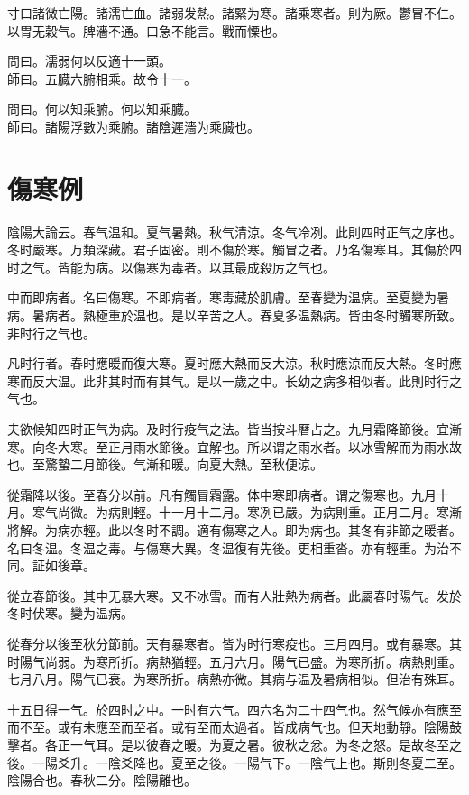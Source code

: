 \documentclass[b5paper,twoside,zihao=-4,UTF8]{ctexbook}
\begin{document}
寸口諸微亡陽。諸濡亡血。諸弱发熱。諸緊为寒。諸乘寒者。則为厥。鬱冒不仁。以胃无穀气。脾濇不通。口急不能言。戰而慄也。

問曰。濡弱何以反適十一頭。\\
師曰。五臓六腑相乘。故令十一。

問曰。何以知乘腑。何以知乘臓。\\
師曰。諸陽浮數为乘腑。諸陰遲濇为乘臓也。

\chapter{傷寒例}

陰陽大論云。春气温和。夏气暑熱。秋气清涼。冬气冷冽。此則四时正气之序也。冬时嚴寒。万類深藏。君子固密。則不傷於寒。觸冒之者。乃名傷寒耳。其傷於四时之气。皆能为病。以傷寒为毒者。以其最成殺厉之气也。

中而即病者。名曰傷寒。不即病者。寒毒藏於肌膚。至春變为温病。至夏變为暑病。暑病者。熱極重於温也。是以辛苦之人。春夏多温熱病。皆由冬时觸寒所致。非时行之气也。

凡时行者。春时應暖而復大寒。夏时應大熱而反大涼。秋时應涼而反大熱。冬时應寒而反大温。此非其时而有其气。是以一歲之中。长幼之病多相似者。此則时行之气也。

夫欲候知四时正气为病。及时行疫气之法。皆当按斗曆占之。九月霜降節後。宜漸寒。向冬大寒。至正月雨水節後。宜解也。所以谓之雨水者。以冰雪解而为雨水故也。至驚蟄二月節後。气漸和暖。向夏大熱。至秋便涼。

從霜降以後。至春分以前。凡有觸冒霜露。体中寒即病者。谓之傷寒也。九月十月。寒气尚微。为病則輕。十一月十二月。寒冽已嚴。为病則重。正月二月。寒漸將解。为病亦輕。此以冬时不調。適有傷寒之人。即为病也。其冬有非節之暖者。名曰冬温。冬温之毒。与傷寒大異。冬温復有先後。更相重沓。亦有輕重。为治不同。証如後章。

從立春節後。其中无暴大寒。又不冰雪。而有人壯熱为病者。此屬春时陽气。发於冬时伏寒。變为温病。

從春分以後至秋分節前。天有暴寒者。皆为时行寒疫也。三月四月。或有暴寒。其时陽气尚弱。为寒所折。病熱猶輕。五月六月。陽气已盛。为寒所折。病熱則重。七月八月。陽气已衰。为寒所折。病熱亦微。其病与温及暑病相似。但治有殊耳。

十五日得一气。於四时之中。一时有六气。四六名为二十四气也。然气候亦有應至而不至。或有未應至而至者。或有至而太過者。皆成病气也。但天地動靜。陰陽鼓擊者。各正一气耳。是以彼春之暖。为夏之暑。彼秋之忿。为冬之怒。是故冬至之後。一陽爻升。一陰爻降也。夏至之後。一陽气下。一陰气上也。斯則冬夏二至。陰陽合也。春秋二分。陰陽離也。
\end{document}
